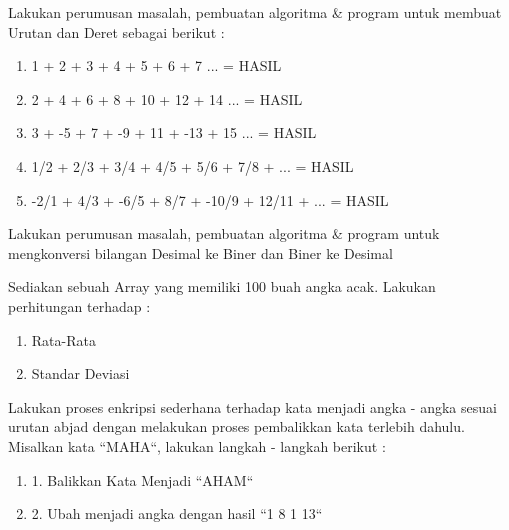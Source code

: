 \begin{pemrograman}
Lakukan perumusan masalah, pembuatan algoritma \& program untuk membuat Urutan dan Deret sebagai berikut : 
\begin{enumerate}
	\item 1 + 2 + 3 + 4 + 5 + 6 + 7 ...  = HASIL
	\item 2 + 4 + 6 + 8 + 10 + 12 + 14 ...  = HASIL
	\item 3 + -5 + 7 + -9 + 11 + -13 + 15 ... = HASIL
	\item 1/2 + 2/3 + 3/4 + 4/5 + 5/6 + 7/8 + ...  = HASIL
	\item -2/1 + 4/3 + -6/5 + 8/7 + -10/9 + 12/11 + ...  = HASIL
\end{enumerate}
\end{pemrograman}

\begin{pemrograman}
Lakukan perumusan masalah, pembuatan algoritma \& program untuk mengkonversi bilangan Desimal ke Biner dan Biner ke Desimal
\end{pemrograman}

\begin{pemrograman}
Sediakan sebuah Array yang memiliki 100 buah angka acak. Lakukan perhitungan terhadap : 
\begin{enumerate}
	\item Rata-Rata
	\item Standar Deviasi
\end{enumerate}
\end{pemrograman}

\begin{pemrograman}
Lakukan proses enkripsi sederhana terhadap kata menjadi angka - angka sesuai urutan abjad dengan melakukan proses pembalikkan kata terlebih dahulu. Misalkan kata ``MAHA``, lakukan langkah - langkah berikut :
\begin{enumerate}
	\item 1. Balikkan Kata Menjadi ``AHAM``
	\item 2. Ubah menjadi angka dengan hasil ``1 8 1 13``
\end{enumerate}
\end{pemrograman}



